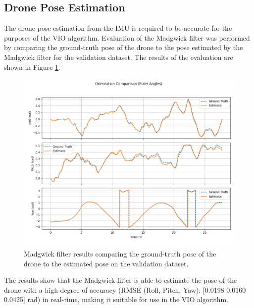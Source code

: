 \documentclass[bare_jrnl_transmag]{subfiles}
\begin{document}
\subsection{Drone Pose Estimation}
The drone pose estimation from the IMU is required to be accurate for the purposes of the VIO algorithm. Evaluation of the Madgwick filter was performed by comparing the ground-truth pose of the drone to the pose estimated by the Madgwick filter for the validation dataset. The results of the evaluation are shown in Figure \ref{fig:madgwick_results}.

\begin{figure}[H]
    \centering
    \includegraphics[width=0.8\linewidth]{figures/madgwick_results.png}
    \caption{Madgwick filter results comparing the ground-truth pose of the drone to the estimated pose on the validation dataset.}
    \label{fig:madgwick_results}
\end{figure}

The results show that the Madgwick filter is able to estimate the pose of the drone with a high degree of accuracy (RMSE (Roll, Pitch, Yaw): [0.0198 0.0160 0.0425] rad) in real-time, making it suitable for use in the VIO algorithm.
\end{document}
